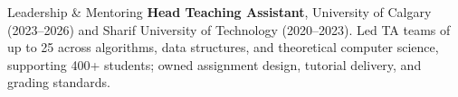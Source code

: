 \documentclass{resume}
\begin{document}
\begin{rSection}{Leadership \& Mentoring}
\textbf{Head Teaching Assistant}, University of Calgary (2023--2026) and Sharif University of Technology (2020--2023). Led TA
teams of up to 25 across algorithms, data structures, and theoretical computer science, supporting 400+ students; owned
assignment design, tutorial delivery, and grading standards.
\end{rSection}
\end{document}
